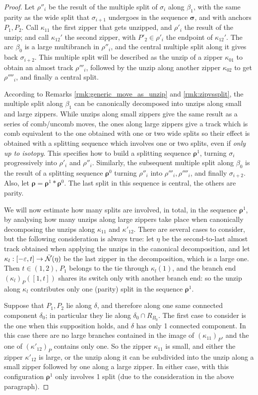 \begin{proof}
Let $\rho''_i$ be the result of the multiple split of $\sigma_i$ along $\beta_1$, with the same parity as the wide split that $\sigma_{i+1}$ undergoes in the sequence $\bm\sigma$, and with anchors $P_1,P_2$. Call $\kappa_{11}$ the first zipper that gets unzipped, and $\rho'_i$ the result of the unzip; and call $\kappa_{12}'$ the second zipper, with $P'_2\in\rho'_i$ the endpoint of $\kappa_{12}'$. The arc $\beta_0$ is a large multibranch in $\rho''_i$, and the central multiple split along it gives back $\sigma_{i+2}$. This multiple split will be described as the unzip of a zipper $\kappa_{01}$ to obtain an almost track $\rho'''_i$, followed by the unzip along another zipper $\kappa_{02}$ to get $\rho''''_i$, and finally a central split.

According to Remarks \ref{rmk:generic_move_as_unzip} and \ref{rmk:zipvssplit}, the multiple split along $\beta_1$ can be canonically decomposed into unzips along small and large zippers. While unzips along small zippers give the same result as a series of comb/uncomb moves, the ones along large zippers give a track which is comb equivalent to the one obtained with one or two wide splits so their effect is obtained with a splitting sequence which involves one or two splits, even if \emph{only up to isotopy}. This specifies how to build a splitting sequence $\bm\rho^1$, turning $\sigma_i$ progressively into $\rho'_i$ and $\rho''_i$. Similarly, the subsequent multiple split along $\beta_0$ is the result of a splitting sequence $\bm\rho^0$ turning $\rho''_i$ into $\rho'''_i,\rho''''_i$, and finally $\sigma_{i+2}$. Also, let $\bm\rho=\bm\rho^1*\bm\rho^0$. The last split in this sequence is central, the others are parity.

We will now estimate how many splits are involved, in total, in the sequence $\bm\rho^1$, by analysing how many unzips along large zippers take place when canonically decomposing the unzips along $\kappa_{11}$ and $\kappa'_{12}$. There are several cases to consider, but the following consideration is always true: let $\eta$ be the second-to-last almost track obtained when applying the unzips in the canonical decomposition, and let $\kappa_l:[-\varepsilon,t]\rightarrow \bar{{\mathcal N}}(\eta)$ be the last zipper in the decomposition, which is a large one. Then $t\in(1,2)$, $P_1$ belongs to the tie through $\kappa_l(1)$, and the branch end $(\kappa_l)_P([1,t])$ shares its switch only with another branch end: so the unzip along $\kappa_l$ contributes only one (parity) split in the sequence $\bm\rho^1$.

Suppose that $P_1,P_2$ lie along $\delta$, and therefore along one same connected component $\delta_0$; in particular they lie along $\delta_0\cap R_{B_0}$. The first case to consider is the one when this supposition holds, and $\delta$ has only 1 connected component. In this case there are no large branches contained in the image of $(\kappa_{11})_P$, and the one of $(\kappa'_{12})_P$ contains only one. So the zipper $\kappa_{11}$ is small, and either the zipper $\kappa'_{12}$ is large, or the unzip along it can be subdivided into the unzip along a small zipper followed by one along a large zipper. In either case, with this configuration $\bm\rho^1$ only involves 1 split (due to the consideration in the above paragraph).


\end{proof}
